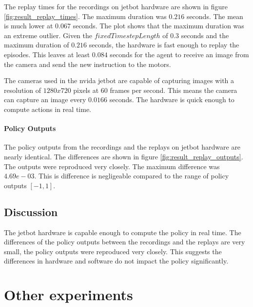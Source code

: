The replay times for the recordings on jetbot hardware are shown in figure \ref{fig:result_replay_times}. The maximum duration was $0.216$ seconds. The mean is much lower at $0.067$ seconds. The plot shows that the maximum duration was an extreme outlier.
Given the $fixedTimestepLength$ of $0.3$ seconds and the maximum duration of $0.216$ seconds, the hardware is fast enough to replay the episodes. This leaves at least $0.084$ seconds for the agent to receive an image from the camera and send the new instruction to the motors.

The cameras used in the nvida jetbot are capable of capturing images with a resolution of $1280x720$ pixels at $60$ frames per second. This means the camera can capture an image every $0.0166$ seconds. The hardware is quick enough to compute actions in real time.


\paragraph{Policy Outputs}

The policy outputs from the recordings and the replays on jetbot hardware are nearly identical. The differences are shown in figure \ref{fig:result_replay_outputs}. The outputs were reproduced very closely. The maximum difference was $4.69e-03$.  This is difference is negligeable compared to the range of policy outputs $[-1,1]$.


\subsection{Discussion}

The jetbot hardware is capable enough to compute the policy in real time. The differences of the policy outputs between the recordings and the replays are very small, the policy outputs were reproduced very closely. This suggests the differences in hardware and software do not impact the policy significantly.

\section{Other experiments}

